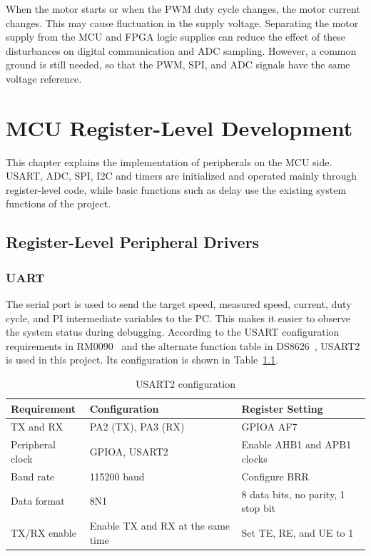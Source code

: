 \documentclass[12pt, a4paper]{report}
\begin{document}
When the motor starts or when the PWM duty cycle changes, the motor current changes. This may cause fluctuation in the supply voltage. Separating the motor supply from the MCU and FPGA logic supplies can reduce the effect of these disturbances on digital communication and ADC sampling. However, a common ground is still needed, so that the PWM, SPI, and ADC signals have the same voltage reference.


\chapter{MCU Register-Level Development}

This chapter explains the implementation of peripherals on the MCU side. USART, ADC, SPI, I2C and timers are initialized and operated mainly through register-level code, while basic functions such as delay use the existing system functions of the project.


\section{Register-Level Peripheral Drivers}
\subsection{UART}

The serial port is used to send the target speed, measured speed, current, duty cycle, and PI intermediate variables to the PC. This makes it easier to observe the system status during debugging. According to the USART configuration requirements in RM0090~\cite{rm0090} and the alternate function table in DS8626~\cite{ds8626}, USART2 is used in this project. Its configuration is shown in Table~\ref{tab:usart2_config}.

\begin{table}[H]
\centering
\caption{USART2 configuration}
\label{tab:usart2_config}
\small
\begin{tabular}{@{}p{}p{}p{}@{}}
\toprule
Requirement & Configuration & Register Setting \\
\midrule
TX and RX & PA2 (TX), PA3 (RX) & GPIOA AF7 \\
Peripheral clock & GPIOA, USART2 & Enable AHB1 and APB1 clocks \\
Baud rate & 115200 baud & Configure BRR \\
Data format & 8N1 & 8 data bits, no parity, 1 stop bit \\
TX/RX enable & Enable TX and RX at the same time & Set TE, RE, and UE to 1 \\
\bottomrule
\end{tabular}
\end{table}
\end{document}
